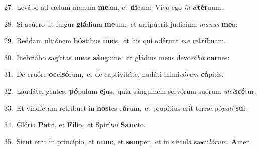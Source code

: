 {\numbfont\textcolor{\numbcolor}{27.}}~Levábo ad cælum manum \textbf{me}\-am, et \textbf{di}\-cam:~\star Vivo ego \textit{in} \textit{æ}\-\textbf{tér}num.\par
{\numbfont\textcolor{\numbcolor}{28.}}~Si acúero ut fulgur \textbf{glá}\-dium \textbf{me}\-um,~\star et arripúerit judícium \textit{ma}\-\textit{nus} \textbf{me}\-a:\par
{\numbfont\textcolor{\numbcolor}{29.}}~Reddam ultiónem \textbf{hós}\-tibus \textbf{me}\-is,~\star et his qui odérunt \textit{me} \textit{re}\-\textbf{trí}buam.\par
{\numbfont\textcolor{\numbcolor}{30.}}~Inebriábo sagíttas \textbf{me}\-as \textbf{sán}\-guine,~\star et gládius meus devo\-\textit{rá}\-\textit{bit} \textbf{car}\-nes:\par
{\numbfont\textcolor{\numbcolor}{31.}}~De cruóre \textbf{oc}\-ci\-\textbf{só}\-rum,~\star et de captivitáte, nudáti inimi\-\textit{có}\-\textit{rum} \textbf{cá}\-pitis.\par
{\numbfont\textcolor{\numbcolor}{32.}}~Laudáte, gentes, \textbf{pó}\-pulum \textbf{e}\-jus,~\star quia sánguinem servórum suórum \textit{ul}\-\textit{ci}\textbf{scé}tur:\par
{\numbfont\textcolor{\numbcolor}{33.}}~Et vindíctam retríbuet in \textbf{hos}\-tes e\-\textbf{ó}\-rum,~\star et propítius erit terræ pó\-\textit{pu}\-\textit{li} \textbf{su}\-i.\par
{\numbfont\textcolor{\numbcolor}{34.}}~Glória \textbf{Pa}\-tri, et \textbf{Fí}\-lio,~\star et Spirí\-\textit{tu}\-\textit{i} \textbf{Sanc}\-to.\par
{\numbfont\textcolor{\numbcolor}{35.}}~Sicut erat in princípio, et \textbf{nunc}\-, et \textbf{sem}\-per,~\star et in sǽcula sæcu\-\textit{ló}\-\textit{rum}. \textbf{A}\-men.\par
